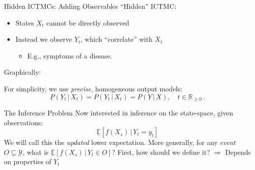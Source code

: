 \documentclass{beamer}
\begin{document}
\begin{frame}{Hidden ICTMCs: Adding Observables}
``Hidden'' ICTMC:
\begin{itemize}
\item States $X_t$ cannot be directly observed
\item Instead we observe $Y_t$, which ``correlate'' with $X_t$
\begin{itemize}
\item E.g., symptoms of a disease.
\end{itemize}
\end{itemize}
\quad\newline
Graphically:\newline\newline
{}
\quad\newline\newline
For simplicity, we use \emph{precise}, homogeneous output models: 
\begin{equation*}
\underline{P}(Y_t\,\vert\,X_t)=P(Y_t\,\vert\,X_t)=P(Y\,\vert\,X),\quad t\in\mathbb{R}_{\geq 0}\,.
\end{equation*}
\end{frame}

\begin{frame}{The Inference Problem}
Now interested in inference on the state-space, given observations:
\begin{equation*}
\underline{\mathbb{E}}[f(X_s)\,\vert\,Y_t=y_t]
\end{equation*}
We will call this the \emph{updated} lower expectation.
\newline\newline
More generally, for any \emph{event} $O\subseteq \mathcal{Y}$, what is $\underline{\mathbb{E}}[f(X_s)\,\vert\,Y_t\in O]$?
\newline\newline
First, how should we define it?
\newline
$\Rightarrow$ Depends on properties of $Y_t$
\end{frame}
\end{document}
